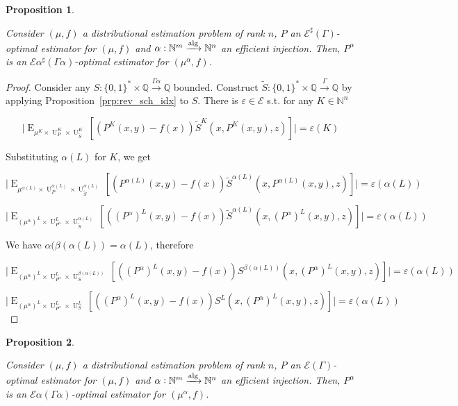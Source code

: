 \documentclass{article}
\numberwithin{equation}{section}
\theoremstyle{definition}
\theoremstyle{plain}
\newtheorem{proposition}{Proposition}[section]
\newcommand{\Bool}{\{0,1\}}
\newcommand{\Words}{{\Bool^*}}
\DeclareMathOperator{\E}{E}
\DeclareMathOperator{\Un}{U}
\newcommand{\Nats}{\mathbb{N}}
\newcommand{\Rats}{\mathbb{Q}}
\newcommand{\Abs}[1]{\lvert #1 \rvert}
\newcommand{\Fall}{\mathcal{E}}
\newcommand{\EG}{\Fall(\Gamma)}
\newcommand{\ESG}{\Fall^\sharp(\Gamma)}
\newcommand{\Alg}{\xrightarrow{\textnormal{alg}}}
\newcommand{\Scheme}{\xrightarrow{\Gamma}}
\begin{document}
\begin{samepage}
\begin{proposition}
\label{prp:idx_reduce_sharp}

Consider $(\mu,f)$ a distributional estimation problem of rank ${n}$, ${P}$ an ${\ESG}$-optimal estimator for ${(\mu,f)}$ and ${\alpha: \Nats^m \Alg \Nats^n}$ an efficient injection. Then, ${P^\alpha}$ is an ${\Fall \alpha^\sharp(\Gamma \alpha)}$-optimal estimator for ${(\mu^\alpha,f)}$.

\end{proposition}
\end{samepage}

\begin{proof}

Consider any ${S: \Words \times \Rats \xrightarrow{\Gamma \alpha} \Rats}$ bounded. Construct ${\tilde{S}: \Words \times \Rats \Scheme \Rats}$ by applying Proposition~\ref{prp:rev_sch_idx} to ${S}$. There is ${\varepsilon \in \Fall}$ s.t. for any ${K \in \Nats^n}$

\[\Abs{\E_{\mu^{K} \times \Un_P^K \times \Un_{\tilde{S}}^K}[(P^K(x,y) - f(x))\tilde{S}^K(x,P^K(x,y),z)]}=\varepsilon(K)\]

Substituting ${\alpha(L)}$ for ${K}$, we get

\[\Abs{\E_{\mu^{\alpha(L)} \times \Un_P^{\alpha(L)} \times \Un_{\tilde{S}}^{\alpha(L)}}[(P^{\alpha(L)}(x,y) - f(x))\tilde{S}^{\alpha(L)}(x,P^{\alpha(L)}(x,y),z)]}=\varepsilon(\alpha(L))\]

\[\Abs{\E_{(\mu^\alpha)^{L} \times \Un_{P^\alpha}^{L} \times \Un_{\tilde{S}}^{\alpha(L)}}[((P^\alpha)^{L}(x,y) - f(x))\tilde{S}^{\alpha(L)}(x,(P^\alpha)^{L}(x,y),z)]}=\varepsilon(\alpha(L))\]

We have ${\alpha(\beta(\alpha(L))=\alpha(L)}$, therefore

\[\Abs{\E_{(\mu^\alpha)^{L} \times \Un_{P^\alpha}^{L} \times \Un_{S}^{\beta(\alpha(L))}}[((P^\alpha)^{L}(x,y) - f(x))S^{\beta(\alpha(L))}(x,(P^\alpha)^{L}(x,y),z)]}=\varepsilon(\alpha(L))\]

\[\Abs{\E_{(\mu^\alpha)^{L} \times \Un_{P^\alpha}^{L} \times \Un_{S}^{L}}[((P^\alpha)^{L}(x,y) - f(x))S^{L}(x,(P^\alpha)^{L}(x,y),z)]}=\varepsilon(\alpha(L))\]
%
\end{proof}

\begin{samepage}
\begin{proposition}
\label{prp:idx_reduce}

Consider $(\mu,f)$ a distributional estimation problem of rank ${n}$, ${P}$ an ${\EG}$-optimal estimator for ${(\mu,f)}$ and ${\alpha: \Nats^m \Alg \Nats^n}$ an efficient injection. Then, ${P^\alpha}$ is an ${\Fall \alpha(\Gamma \alpha)}$-optimal estimator for ${(\mu^\alpha,f)}$.

\end{proposition}
\end{samepage}
\end{document}
